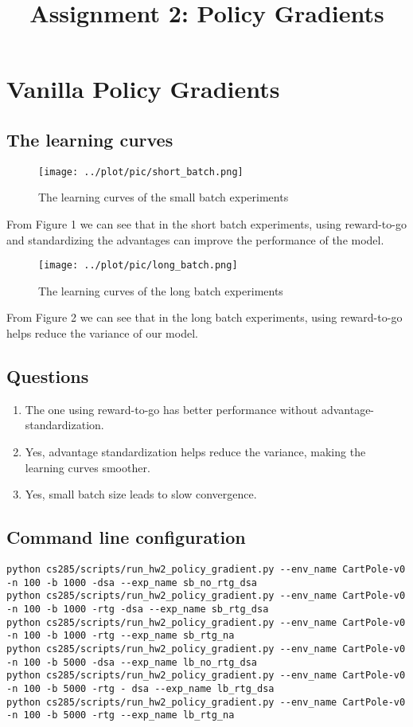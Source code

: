 \documentclass[10pt, a4paper]{ctexart}
\begin{document}
\title{Assignment 2: Policy Gradients}
\date{}
\author{}
\maketitle

\section{Vanilla Policy Gradients}
\subsection{The learning curves}
\begin{figure}[H]
    \centering
    \texttt{[image: ../plot/pic/short\_batch.png]}
    \caption{The learning curves of the small batch experiments}
\end{figure}
From Figure 1 we can see that in the short batch experiments, using reward-to-go and standardizing the advantages can improve the performance of the model.\par
\begin{figure}[H]
    \centering
    \texttt{[image: ../plot/pic/long\_batch.png]}
    \caption{The learning curves of the long batch experiments}
\end{figure}
From Figure 2 we can see that in the long batch experiments, using reward-to-go helps reduce the variance of our model.
\subsection{Questions}
\begin{enumerate}
    \item The one using reward-to-go has better performance without advantage-standardization.
    \item Yes, advantage standardization helps reduce the variance, making the learning curves smoother.
    \item Yes, small batch size leads to slow convergence.
\end{enumerate}
\subsection{Command line configuration}
\begin{lstlisting}[breaklines=true,keywordstyle=\color{blue!90}\bfseries]
python cs285/scripts/run_hw2_policy_gradient.py --env_name CartPole-v0 -n 100 -b 1000 -dsa --exp_name sb_no_rtg_dsa
python cs285/scripts/run_hw2_policy_gradient.py --env_name CartPole-v0 -n 100 -b 1000 -rtg -dsa --exp_name sb_rtg_dsa
python cs285/scripts/run_hw2_policy_gradient.py --env_name CartPole-v0 -n 100 -b 1000 -rtg --exp_name sb_rtg_na
python cs285/scripts/run_hw2_policy_gradient.py --env_name CartPole-v0 -n 100 -b 5000 -dsa --exp_name lb_no_rtg_dsa
python cs285/scripts/run_hw2_policy_gradient.py --env_name CartPole-v0 -n 100 -b 5000 -rtg - dsa --exp_name lb_rtg_dsa
python cs285/scripts/run_hw2_policy_gradient.py --env_name CartPole-v0 -n 100 -b 5000 -rtg --exp_name lb_rtg_na
\end{lstlisting}
\end{document}
